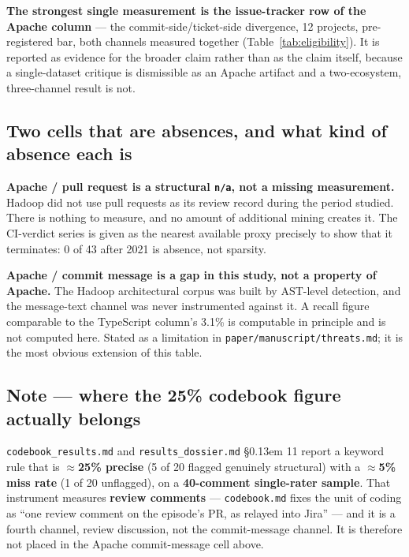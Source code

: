 \documentclass[conference]{IEEEtran}
\begin{document}
\textbf{The strongest single measurement is the issue-tracker row of the Apache column} --- the commit-side/ticket-side divergence, 12 projects, pre-registered bar, both channels measured together (Table~\ref{tab:eligibility}). It is reported as evidence for the broader claim rather than as the claim itself, because a single-dataset critique is dismissible as an Apache artifact and a two-ecosystem, three-channel result is not.



\subsection*{Two cells that are absences, and what kind of absence each is}




\textbf{Apache / pull request is a structural \texttt{n/\allowbreak{}a}, not a missing measurement.} Hadoop did not use pull requests as its review record during the period studied. There is nothing to measure, and no amount of additional mining creates it. The CI-verdict series is given as the nearest available proxy precisely to show that it terminates: 0 of 43 after 2021 is absence, not sparsity.



\textbf{Apache / commit message is a gap in this study, not a property of Apache.} The Hadoop architectural corpus was built by AST-level detection, and the message-text channel was never instrumented against it. A recall figure comparable to the TypeScript column's 3.1\% is computable in principle and is not computed here. Stated as a limitation in \texttt{paper/\allowbreak{}manuscript/\allowbreak{}threats.\allowbreak{}md}; it is the most obvious extension of this table.



\subsection*{Note --- where the 25\% codebook figure actually belongs}




\texttt{codebook\_\allowbreak{}results.\allowbreak{}md} and \texttt{results\_\allowbreak{}dossier.\allowbreak{}md} \S\kern0.13em 11 report a keyword rule that is \textbf{$\approx$25\% precise} (5 of 20 flagged genuinely structural) with a \textbf{$\approx$5\% miss rate} (1 of 20 unflagged), on a \textbf{40-comment single-rater sample}. That instrument measures \textbf{review comments} --- \texttt{codebook.\allowbreak{}md} fixes the unit of coding as ``one review comment on the episode's PR, as relayed into Jira'' --- and it is a fourth channel, review discussion, not the commit-message channel. It is therefore not placed in the Apache commit-message cell above.
\end{document}
